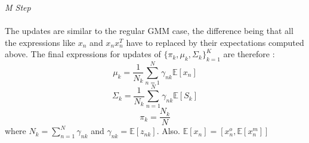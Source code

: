 \documentclass{article}
\begin{document}
\emph{M Step} \\ \\
The updates are similar to the regular GMM case, the difference being that all the expressions like $x_n$ and $x_nx_n^T$ have to replaced by their expectations computed above. The final expressions for updates of $\{\pi_k, \mu_k, \Sigma_k\}_{k=1}^K$ are therefore :
$$\mu_k = \frac{1}{N_k}\sum_{n=1}^N \gamma_{nk}\mathds{E}[x_n]$$
$$\Sigma_k = \frac{1}{N_k}\sum_{n=1}^N \gamma_{nk}\mathds{E}[S_k] $$
$$\pi_k = \frac{N_k}{N}$$
where $N_k = \sum_{n=1}^N \gamma_{nk}$ and $\gamma_{nk}= \mathds{E}[z_{nk}]$. Also. $\mathds{E}[x_n]=[x_n^o, \mathds{E}[x_n^m]]$
\end{document}
